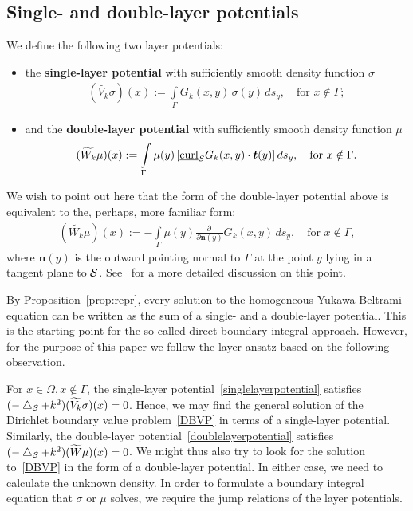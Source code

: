 \subsection{Single- and double-layer potentials}
We define the following two layer potentials:
\begin{itemize}
\item the {\bf single-layer potential} with sufficiently smooth density
function $\sigma$
  \begin{align}
    (\widetilde{V_k}\sigma)(x):=\int\limits_{\Gamma}
    G_k(x,y)\,\sigma(y)\,ds_y,\quad\mbox{for $x \notin \Gamma$};
    \label{singlelayerpotential}
  \end{align}
\item and the {\bf double-layer potential} with sufficiently smooth
density function $\mu$
  \begin{align}
    (\widetilde{W_k}\mu )(x):=\int\limits_{\Gamma}
    \mu(y)\,[\underline{\mbox{curl}}_{\S} G_k(x,y)\cdot \vec{t}(y)]\,
    ds_y, \quad\mbox{for $x\notin\Gamma$}.
    \label{doublelayerpotential}
  \end{align}
\end{itemize}
We wish to point out here that the form of the double-layer potential
above is equivalent to the, perhaps, more familiar form:
\begin{align*}
  (\widetilde{W_k}\mu )(x):=-\int\limits_{\Gamma}
  \mu(y) \frac{\partial \,}{\partial \mathbf{n}(y)} G_k(x,y) \,
  ds_y, \quad\mbox{for $x\notin\Gamma$},
\end{align*}
where $\mathbf{n}(y)$ is the outward pointing normal to $\Gamma$ at the
point $y$ lying in a tangent plane to $\S$.  See~\cite{kro:nig2013} for
a more detailed discussion on this point.

By Proposition~\ref{prop:repr}, every solution to the homogeneous
Yukawa-Beltrami equation can be written as the sum of a single- and a
double-layer potential.  This  is the starting point for the so-called
direct boundary integral approach. However, for the purpose of this
paper we follow the layer ansatz based on the following observation.

For $x \in \Omega, x \notin \Gamma$, the single-layer
potential~\eqref{singlelayerpotential} satisfies $(-\lap_{\S} + k^{2})
(\widetilde{V_k}\sigma)(x)=0$.  Hence, we may find the general solution
of the Dirichlet boundary value problem~\eqref{DBVP} in terms of a
single-layer potential.  Similarly, the double-layer
potential~\eqref{doublelayerpotential} satisfies $(-\lap_{\S} +
k^2)(\widetilde{W}\mu)(x)=0$.  We might thus also try to look for the
solution to~\eqref{DBVP} in the form of a double-layer potential.  In
either case, we need to calculate the unknown density.  In order to
formulate a boundary integral equation that $\sigma$ or $\mu$ solves,
we require the jump relations of the layer potentials.


